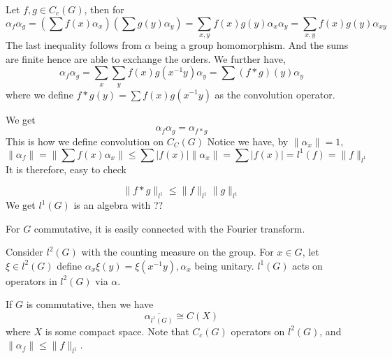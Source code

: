 Let $f,g\in C_c(G)$, then for 
\begin{equation*}
    \alpha_f\alpha_g=(\sum f(x)\alpha_x)(\sum g(y)\alpha_y)=\sum_{x,y}f(x)g(y)\alpha_x\alpha_y=\sum_{x,y}f(x)g(y)\alpha_{xy}
\end{equation*}
The last inequality follows from $\alpha$ being a group homomorphism. And the sums are finite hence are able to exchange the orders.
We further have,
\begin{equation*}
    \alpha_f\alpha_g=\sum_x\sum_yf(x)g(x^{-1}y)\alpha_y=\sum (f\ast g)(y)\alpha_y
\end{equation*}
where we define $f\ast g(y)=\sum f(x)g(x^{-1}y)$ as the convolution operator.


We get
\begin{equation*}
    \alpha_f\alpha_g=\alpha_{f\ast g}
\end{equation*}
This is how we define convolution on $C_C(G)$
Notice we have, by $\|\alpha_x\|=1$,
\begin{equation*}
    \|\alpha_f\|=\|\sum f(x)\alpha_x\|\leq\sum|f(x)|\|\alpha_x\|=\sum|f(x)|=l^1(f)=\|f\|_{l^1}
\end{equation*}
It is therefore, easy to check

\begin{equation*}
    \|f\ast g\|_{l^1}\leq\|f\|_{l^1}\|g\|_{l^1}
\end{equation*}
We get $l^1(G)$ is an algebra with ??

For $G$ commutative, it is easily connected with the Fourier transform.

Consider $l^2(G)$ with the counting measure on the group. For $x\in G$, let $\xi\in l^2(G)$ define $\alpha_x\xi(y)=\xi(x^{-1}y), \alpha_x$ being unitary.
$l^1(G)$ acts on operators in $l^2(G)$ via $\alpha$.


If $G$ is commutative, then we have
\begin{equation*}
    \overline{\alpha_{l^1(G)}}\cong C(X)
\end{equation*}
where $X$ is some compact space.
Note that $C_c(G)$ operators on $l^2(G)$, and $\|\alpha_f\|\leq\|f\|_{l^1}$.

